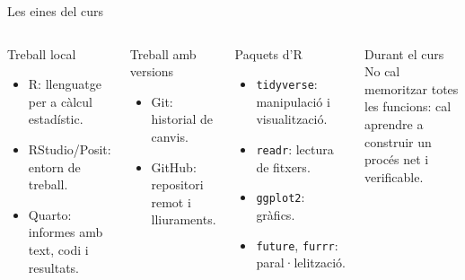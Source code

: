 \documentclass[10pt,aspectratio=169]{beamer}
\newcommand{\R}{\textsf{R}}
\newcommand{\RStudio}{\textsf{RStudio/Posit}}
\newcommand{\GitHub}{\textsf{GitHub}}
\newcommand{\Quarto}{\textsf{Quarto}}
\newcommand{\Git}{\textsf{Git}}
\begin{document}
\begin{frame}{Les eines del curs}
\begin{columns}[T]
\begin{block}{Treball local}
\begin{itemize}
  \item \R: llenguatge per a càlcul estadístic.
  \item \RStudio: entorn de treball.
  \item \Quarto: informes amb text, codi i resultats.
\end{itemize}
\end{block}

\begin{block}{Treball amb versions}
\begin{itemize}
  \item \Git: historial de canvis.
  \item \GitHub: repositori remot i lliuraments.
\end{itemize}
\end{block}

\begin{block}{Paquets d'\R}
\begin{itemize}
  \item \texttt{tidyverse}: manipulació i visualització.
  \item \texttt{readr}: lectura de fitxers.
  \item \texttt{ggplot2}: gràfics.
  \item \texttt{future}, \texttt{furrr}: paral·lelització.
\end{itemize}
\end{block}

\begin{alertblock}{Durant el curs}
No cal memoritzar totes les funcions: cal aprendre a construir un procés net i verificable.
\end{alertblock}
\end{columns}
\end{frame}
\end{document}
